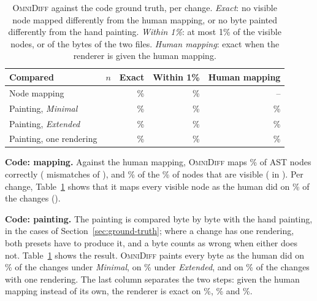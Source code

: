 \documentclass[sigconf,review]{acmart}
\begin{document}
\begin{table}
  \caption{\textsc{OmniDiff} against the code ground truth, per change. \emph{Exact}: no visible
  node mapped differently from the human mapping, or no byte painted differently from the hand
  painting. \emph{Within 1\%}: at most 1\% of the visible nodes, or of the bytes of the two
  files. \emph{Human mapping}: exact when the renderer is given the human mapping.}
  \label{tab:omnidiff-accuracy}
  \small
  \setlength{\tabcolsep}{4pt}
  \begin{tabular}{@{}lrrrr@{}}
    \toprule
    Compared & $n$ & Exact & Within 1\% & Human mapping \\
    \midrule
    Node mapping & \MappingFixtures{} & \MappingZeroVisiblePct{}\% & \MappingWithinOnePct{}\% & -- \\
    Painting, \emph{Minimal} & \PaintingMinimalFixtures{} & \PaintingMinimalZeroPct{}\% & \PaintingMinimalWithinOnePct{}\% & \PaintingMinimalIdealZeroPct{}\% \\
    Painting, \emph{Extended} & \PaintingExtendedFixtures{} & \PaintingExtendedZeroPct{}\% & \PaintingExtendedWithinOnePct{}\% & \PaintingExtendedIdealZeroPct{}\% \\
    Painting, one rendering & \PaintingSingleFixtures{} & \PaintingSingleZeroPct{}\% & \PaintingSingleWithinOnePct{}\% & \PaintingSingleIdealZeroPct{}\% \\
    \bottomrule
  \end{tabular}
\end{table}

\textbf{Code: mapping.} Against the human mapping, \textsc{OmniDiff} maps \NodeAccuracyPct{}\% of
AST nodes correctly (\NodeMismatches{} mismatches of \NodesTotal{}), and
\VisibleNodeAccuracyPct{}\% of the \VisibleNodeShare{}\% of nodes that are visible
(\VisibleNodeMismatches{} in \VisibleNodesTotal{}). Per change,
Table~\ref{tab:omnidiff-accuracy} shows that it maps every visible node as the human did on
\MappingZeroVisiblePct{}\% of the \MappingFixtures{} changes (\MappingZeroVisible{}).

\textbf{Code: painting.} The painting is compared byte by byte with the hand painting, in the
cases of Section~\ref{sec:ground-truth}; where a change has one rendering, both presets
have to produce it, and a byte counts as wrong when either does not.
Table~\ref{tab:omnidiff-accuracy} shows the result. \textsc{OmniDiff} paints every byte as the
human did on \PaintingMinimalZeroPct{}\% of the changes under \emph{Minimal}, on
\PaintingExtendedZeroPct{}\% under \emph{Extended}, and on \PaintingSingleZeroPct{}\% of the changes
with one rendering. The last column separates the two steps: given the human mapping instead of its
own, the renderer is exact on \PaintingMinimalIdealZeroPct{}\%, \PaintingExtendedIdealZeroPct{}\%
and \PaintingSingleIdealZeroPct{}\%.
\end{document}
